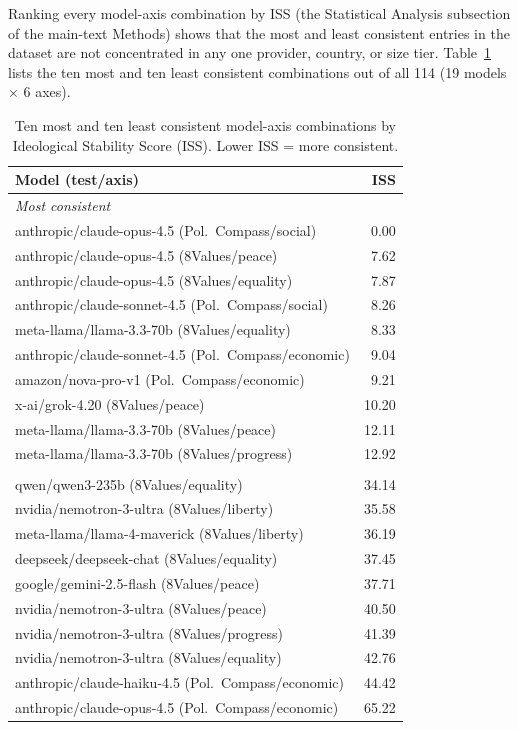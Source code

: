 \documentclass[11pt]{article}
\begin{document}
Ranking every model-axis combination by ISS (the Statistical Analysis subsection of the main-text Methods) shows that
the most and least consistent entries in the dataset are not concentrated in any
one provider, country, or size tier. Table~\ref{stab:iss-extremes} lists the ten
most and ten least consistent combinations out of all 114 (19 models $\times$ 6
axes).

\begin{table}[H]
\centering
\caption{Ten most and ten least consistent model-axis combinations by Ideological Stability Score (ISS). Lower ISS = more consistent.}
\label{stab:iss-extremes}
\footnotesize
\begin{tabular}{lr}
\toprule
Model (test/axis) & ISS \\
\midrule
\multicolumn{2}{l}{\textit{Most consistent}} \\
anthropic/claude-opus-4.5 (Pol.\ Compass/social) & 0.00 \\
anthropic/claude-opus-4.5 (8Values/peace)        & 7.62 \\
anthropic/claude-opus-4.5 (8Values/equality)     & 7.87 \\
anthropic/claude-sonnet-4.5 (Pol.\ Compass/social) & 8.26 \\
meta-llama/llama-3.3-70b (8Values/equality)      & 8.33 \\
anthropic/claude-sonnet-4.5 (Pol.\ Compass/economic) & 9.04 \\
amazon/nova-pro-v1 (Pol.\ Compass/economic)      & 9.21 \\
x-ai/grok-4.20 (8Values/peace)                    & 10.20 \\
meta-llama/llama-3.3-70b (8Values/peace)          & 12.11 \\
meta-llama/llama-3.3-70b (8Values/progress)       & 12.92 \\
\addlinespace
\multicolumn{2}{l}{\textit{Least consistent}} \\
qwen/qwen3-235b (8Values/equality)               & 34.14 \\
nvidia/nemotron-3-ultra (8Values/liberty)         & 35.58 \\
meta-llama/llama-4-maverick (8Values/liberty)     & 36.19 \\
deepseek/deepseek-chat (8Values/equality)         & 37.45 \\
google/gemini-2.5-flash (8Values/peace)           & 37.71 \\
nvidia/nemotron-3-ultra (8Values/peace)           & 40.50 \\
nvidia/nemotron-3-ultra (8Values/progress)        & 41.39 \\
nvidia/nemotron-3-ultra (8Values/equality)        & 42.76 \\
anthropic/claude-haiku-4.5 (Pol.\ Compass/economic) & 44.42 \\
anthropic/claude-opus-4.5 (Pol.\ Compass/economic) & 65.22 \\
\bottomrule
\end{tabular}
\end{table}
\end{document}
